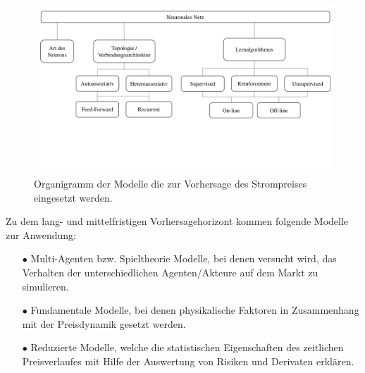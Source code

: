 \begin{figure}[!b] %
    \centering
        \includegraphics[page=2,width=1\textwidth]{Bilder/misc/ANN_Organigramme.pdf}
    \caption[Modelle die zur Vorhersage des Strompreises]{Organigramm der Modelle die zur Vorhersage des Strompreises eingesetzt werden.\,\protect\footnotemark{}}
    \label{fig:ann_vorhers._modelle}
\end{figure}
\addtocounter{footnote}{-1}     %
\addtocounter{Hfootnote}{-1}    %
\wrapfigfoot{}



Zu dem lang- und mittelfristigen Vorhersagehorizont kommen folgende Modelle zur Anwendung:
\begin{itemize}
\item[\textbf{$\bullet$}]%
Multi-Agenten bzw. Spieltheorie Modelle, bei denen versucht wird, das Verhalten der unterschiedlichen Agenten/Akteure auf dem Markt zu simulieren.

\item[\textbf{$\bullet$}]%
Fundamentale Modelle, bei denen physikalische Faktoren in Zusammenhang mit der Preisdynamik gesetzt werden.

\item[\textbf{$\bullet$}]%
Reduzierte Modelle, welche die statistischen Eigenschaften des zeitlichen Preisverlaufes mit Hilfe der Auswertung von Risiken und Derivaten erklären.
\end{itemize}


